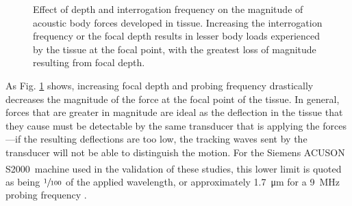 			\begin{figure}[!htb]
				\centering
				\caption[Effect of depth and interrogation frequency on magnitude of acoustic body forces]{Effect of depth and interrogation frequency on the magnitude of acoustic body forces developed in tissue. Increasing the interrogation frequency or the focal depth results in lesser body loads experienced by the tissue at the focal point, with the greatest loss of magnitude resulting from focal depth.}
				\label{fig:freq-depth-force}
			\end{figure}

			As Fig. \ref{fig:freq-depth-force} shows, increasing focal depth and probing frequency drastically decreases the magnitude of the force at the focal point of the tissue. In general, forces that are greater in magnitude are ideal as the deflection in the tissue that they cause must be detectable by the same transducer that is applying the forces---if the resulting deflections are too low, the tracking waves sent by the transducer will not be able to distinguish the motion. For the Siemens ACUSON S2000\textsuperscript{\texttrademark}\ machine used in the validation of these studies, this lower limit is quoted as being $\sfrac{1}{100}$ of the applied wavelength, or approximately \SI{1.7}{\um} for a \SI{9}{\MHz} probing frequency \cite{SiemensVirtualTouch}.

